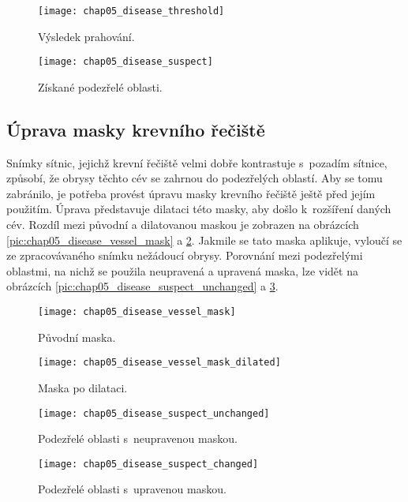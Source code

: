 \begin{figure}[h]
  \begin{minipage}[c]{0.47\textwidth}
    \texttt{[image: chap05\_disease\_threshold]}
    \caption{Výsledek prahování.}
    \label{pic:chap05_disease_threshold}
  \end{minipage}
  \hfill
  \begin{minipage}[c]{0.47\textwidth}
    \texttt{[image: chap05\_disease\_suspect]}
    \caption{Získané podezřelé oblasti.}
    \label{pic:chap05_disease_suspect}
  \end{minipage}
\end{figure}


\subsection*{Úprava masky krevního řečiště}
Snímky sítnic, jejichž krevní řečiště velmi dobře kontrastuje s~pozadím sítnice, způsobí, že obrysy těchto cév se zahrnou do podezřelých oblastí. Aby se tomu zabránilo, je potřeba provést úpravu masky krevního řečiště ještě před jejím použitím. Úprava představuje dilataci této masky, aby došlo k~rozšíření daných cév. Rozdíl mezi původní a dilatovanou maskou je zobrazen na obrázcích \ref{pic:chap05_disease_vessel_mask} a \ref{pic:chap05_disease_vessel_mask_dilated}. Jakmile se tato maska aplikuje, vyloučí se ze zpracovávaného snímku nežádoucí obrysy. Porovnání mezi podezřelými oblastmi, na nichž se použila neupravená a upravená maska, lze vidět na obrázcích \ref{pic:chap05_disease_suspect_unchanged} a \ref{pic:chap05_disease_suspect_changed}.

\begin{figure}[h]
  \begin{minipage}[c]{0.47\textwidth}
    \texttt{[image: chap05\_disease\_vessel\_mask]}
    \caption{Původní maska.}
    \label{pic:chap05_disease_vessel_mask}
  \end{minipage}
  \hfill
  \begin{minipage}[c]{0.47\textwidth}
    \texttt{[image: chap05\_disease\_vessel\_mask\_dilated]}
    \caption{Maska po dilataci.}
    \label{pic:chap05_disease_vessel_mask_dilated}
  \end{minipage}
\end{figure}

\begin{figure}[h]
  \begin{minipage}[c]{0.47\textwidth}
    \texttt{[image: chap05\_disease\_suspect\_unchanged]}
    \caption{Podezřelé oblasti s~neupravenou maskou.}
    \label{pic:chap05_disease_suspect_unchanged}
  \end{minipage}
  \hfill
  \begin{minipage}[c]{0.47\textwidth}
    \texttt{[image: chap05\_disease\_suspect\_changed]}
    \caption{Podezřelé oblasti s~upravenou maskou.}
    \label{pic:chap05_disease_suspect_changed}
  \end{minipage}
\end{figure}


